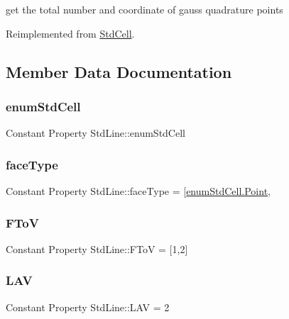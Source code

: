 get the total number and coordinate of gauss quadrature points 



Reimplemented from \hyperlink{class_std_cell_a8652814453f07200e971d4842a6ab8d1}{Std\+Cell}.



\subsection{Member Data Documentation}
\mbox{\label{class_std_line_ac359f91231d2c83bebc2f2f81b7964bf}} 
\subsubsection{\texorpdfstring{enum\+Std\+Cell}{enumStdCell}}
{\footnotesize\ttfamily Constant Property Std\+Line\+::enum\+Std\+Cell}

\mbox{\label{class_std_line_a1eaf548c1295fc34fefab9ed02284b53}} 
\subsubsection{\texorpdfstring{face\+Type}{faceType}}
{\footnotesize\ttfamily Constant Property Std\+Line\+::face\+Type = \mbox{[}\hyperlink{classenum_std_cell_ac4c2fa4e189e76e103f3ff9b1d19b9e7a055fa6159d5be915a3c9df01d16d5bb7}{enum\+Std\+Cell.\+Point},}

\mbox{\label{class_std_line_adc5d41dc29acfdd19dea3ef66a26116f}} 
\subsubsection{\texorpdfstring{F\+ToV}{FToV}}
{\footnotesize\ttfamily Constant Property Std\+Line\+::\+F\+ToV = \mbox{[}1,2\mbox{]}}

\mbox{\label{class_std_line_a41e70ea416de0c8ff46d89da8904ac6a}} 
\subsubsection{\texorpdfstring{L\+AV}{LAV}}
{\footnotesize\ttfamily Constant Property Std\+Line\+::\+L\+AV = 2}

